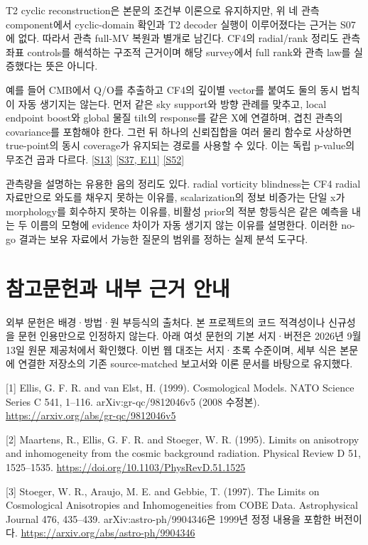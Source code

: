 \documentclass[11pt,a4paper]{article}
\begin{document}
T2 cyclic reconstruction은 본문의 조건부 이론으로 유지하지만, 위 네 관측 component에서 cyclic-domain 확인과 T2 decoder 실행이 이루어졌다는 근거는 S07에 없다. 따라서 관측 full-MV 복원과 별개로 남긴다. CF4의 radial/rank 정리도 관측 좌표 controls를 해석하는 구조적 근거이며 해당 survey에서 full rank와 관측 law를 실증했다는 뜻은 아니다.


예를 들어 CMB에서 Q/O를 추출하고 CF4의 깊이별 vector를 붙여도 둘의 동시 법칙이 자동 생기지는 않는다. 먼저 같은 sky support와 방향 관례를 맞추고, local endpoint boost와 global 물질 tilt의 response를 같은 X에 연결하며, 겹친 관측의 covariance를 포함해야 한다. 그런 뒤 하나의 신뢰집합을 여러 물리 함수로 사상하면 true-point의 동시 coverage가 유지되는 경로를 사용할 수 있다. 이는 독립 p-value의 무조건 곱과 다르다. \hyperlink{src:S13}{[S13]} \hyperlink{src:S37}{[S37, E11]} \hyperlink{src:S52}{[S52]}


관측량을 설명하는 유용한 음의 정리도 있다. radial vorticity blindness는 CF4 radial 자료만으로 와도를 채우지 못하는 이유를, scalarization의 정보 비증가는 단일 x가 morphology를 회수하지 못하는 이유를, 비활성 prior의 적분 항등식은 같은 예측을 내는 두 이름의 모형에 evidence 차이가 자동 생기지 않는 이유를 설명한다. 이러한 no-go 결과는 보유 자료에서 가능한 질문의 범위를 정하는 실제 분석 도구다.


\section*{참고문헌과 내부 근거 안내}


외부 문헌은 배경·방법·원 부등식의 출처다. 본 프로젝트의 코드 적격성이나 신규성을 문헌 인용만으로 인정하지 않는다. 아래 여섯 문헌의 기본 서지·버전은 2026년 9월 13일 원문 제공처에서 확인했다. 이번 웹 대조는 서지·초록 수준이며, 세부 식은 본문에 연결한 저장소의 기존 source-matched 보고서와 이론 문서를 바탕으로 유지했다.


[1] Ellis, G. F. R. and van Elst, H. (1999). Cosmological Models. NATO Science Series C 541, 1–116. arXiv:gr-qc/9812046v5 (2008 수정본). \url{https://arxiv.org/abs/gr-qc/9812046v5}


[2] Maartens, R., Ellis, G. F. R. and Stoeger, W. R. (1995). Limits on anisotropy and inhomogeneity from the cosmic background radiation. Physical Review D 51, 1525–1535. \url{https://doi.org/10.1103/PhysRevD.51.1525}


[3] Stoeger, W. R., Araujo, M. E. and Gebbie, T. (1997). The Limits on Cosmological Anisotropies and Inhomogeneities from COBE Data. Astrophysical Journal 476, 435–439. arXiv:astro-ph/9904346은 1999년 정정 내용을 포함한 버전이다. \url{https://arxiv.org/abs/astro-ph/9904346}
\end{document}
